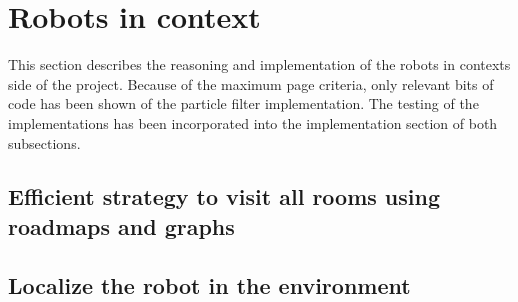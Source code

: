 \documentclass[../../Main.tex]{subfiles}
\begin{document}
\section{Robots in context}%
\label{sec:rob}
This section describes the reasoning and implementation of the robots in contexts side of the project. Because of the maximum page criteria, only relevant bits of code has been shown of the particle filter implementation. The testing of the implementations has been incorporated into the implementation section of both subsections.
\subsection{Efficient strategy to visit all rooms using roadmaps and graphs}%
\label{sec:brushfire}


\subsection{Localize the robot in the environment}%
\label{sub:particle_filter}

\end{document}
